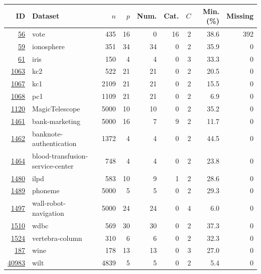 \begin{tabular}{rlrrrrrrr}
\toprule
ID & Dataset & $n$ & $p$ & Num. & Cat. & $C$ & Min. (\%) & Missing \\
\midrule
\href{https://www.openml.org/d/56}{56} & vote & 435 & 16 & 0 & 16 & 2 & 38.6 & 392 \\
\href{https://www.openml.org/d/59}{59} & ionosphere & 351 & 34 & 34 & 0 & 2 & 35.9 & 0 \\
\href{https://www.openml.org/d/61}{61} & iris & 150 & 4 & 4 & 0 & 3 & 33.3 & 0 \\
\href{https://www.openml.org/d/1063}{1063} & kc2 & 522 & 21 & 21 & 0 & 2 & 20.5 & 0 \\
\href{https://www.openml.org/d/1067}{1067} & kc1 & 2109 & 21 & 21 & 0 & 2 & 15.5 & 0 \\
\href{https://www.openml.org/d/1068}{1068} & pc1 & 1109 & 21 & 21 & 0 & 2 & 6.9 & 0 \\
\href{https://www.openml.org/d/1120}{1120} & MagicTelescope & 5000 & 10 & 10 & 0 & 2 & 35.2 & 0 \\
\href{https://www.openml.org/d/1461}{1461} & bank-marketing & 5000 & 16 & 7 & 9 & 2 & 11.7 & 0 \\
\href{https://www.openml.org/d/1462}{1462} & banknote-authentication & 1372 & 4 & 4 & 0 & 2 & 44.5 & 0 \\
\href{https://www.openml.org/d/1464}{1464} & blood-transfusion-service-center & 748 & 4 & 4 & 0 & 2 & 23.8 & 0 \\
\href{https://www.openml.org/d/1480}{1480} & ilpd & 583 & 10 & 9 & 1 & 2 & 28.6 & 0 \\
\href{https://www.openml.org/d/1489}{1489} & phoneme & 5000 & 5 & 5 & 0 & 2 & 29.3 & 0 \\
\href{https://www.openml.org/d/1497}{1497} & wall-robot-navigation & 5000 & 24 & 24 & 0 & 4 & 6.0 & 0 \\
\href{https://www.openml.org/d/1510}{1510} & wdbc & 569 & 30 & 30 & 0 & 2 & 37.3 & 0 \\
\href{https://www.openml.org/d/1524}{1524} & vertebra-column & 310 & 6 & 6 & 0 & 2 & 32.3 & 0 \\
\href{https://www.openml.org/d/187}{187} & wine & 178 & 13 & 13 & 0 & 3 & 27.0 & 0 \\
\href{https://www.openml.org/d/40983}{40983} & wilt & 4839 & 5 & 5 & 0 & 2 & 5.4 & 0 \\
\bottomrule
\end{tabular}
